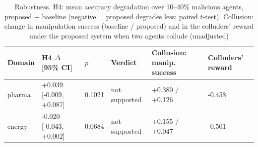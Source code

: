 \begin{table}[t]
\caption{Robustness. H4: mean accuracy degradation over 10--40\% malicious agents, proposed $-$ baseline (negative = proposed degrades less; paired $t$-test). Collusion: change in manipulation success (baseline / proposed) and in the colluders' reward under the proposed system when two agents collude (unadjusted)}\label{tab:robust}
\footnotesize
\begin{tabular}{@{}llllll@{}}
\toprule
Domain & H4 $\Delta$ [95\% CI] & $p$ & Verdict & Collusion: manip. success & Colluders' reward \\
\midrule
pharma & +0.039 [-0.009, +0.087] & 0.1021 & not supported & +0.380 / +0.126 & -0.458 \\
energy & -0.020 [-0.043, +0.002] & 0.0684 & not supported & +0.155 / +0.047 & -0.501 \\
\bottomrule
\end{tabular}
\end{table}
